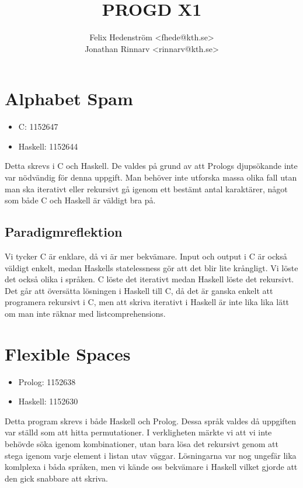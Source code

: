 \documentclass[a4paper]{article}
\begin{document}
\title{PROGD X1}
\author{Felix Hedenström <fhede@kth.se> \\Jonathan Rinnarv <rinnarv@kth.se>}
\maketitle
\pagestyle{fancy}
\rhead{\today \\~}
\section*{Alphabet Spam}
\begin{itemize}
\item C: 1152647
\item Haskell: 1152644
\end{itemize}
Detta skrevs i C och Haskell. De valdes på grund av att Prologs djupsökande inte var nödvändig för denna uppgift. Man behöver inte utforska massa olika fall utan man ska iterativt eller rekursivt gå igenom ett bestämt antal karaktärer, något som både C och Haskell är väldigt bra på.

\subsection*{Paradigmreflektion}
Vi tycker C är enklare, då vi är mer bekvämare. Input och output i C är också väldigt enkelt, medan Haskells statelessness gör att det blir lite krångligt. Vi löste det också olika i språken. C löste det iterativt medan Haskell löste det rekursivt. Det går att översätta lösningen i Haskell till C, då det är ganska enkelt att programera rekursivt i C, men att skriva iterativt i Haskell är inte lika lika lätt om man inte räknar med listcomprehensions.
\section*{Flexible Spaces}

\begin{itemize}
\item Prolog: 1152638
\item Haskell: 1152630
\end{itemize}
Detta program skrevs i både Haskell och Prolog. Dessa språk valdes då uppgiften var ställd som att hitta permutationer. I verkligheten märkte vi att vi inte behövde söka igenom kombinationer, utan bara lösa det rekursivt genom att stega igenom varje element i listan utav väggar. Lösningarna var nog ungefär lika komlplexa i båda språken, men vi kände oss bekvämare i Haskell vilket gjorde att den gick snabbare att skriva.
\end{document}
